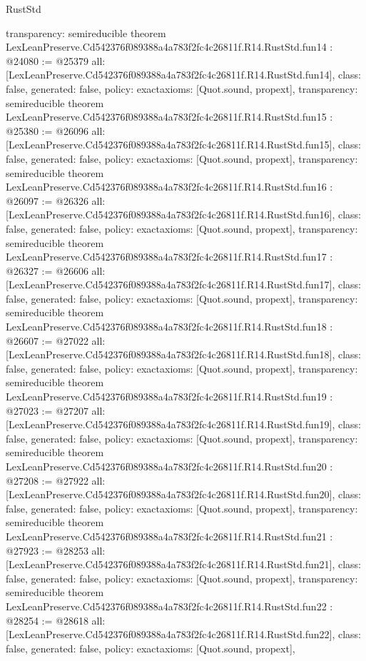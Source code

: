 \begin{lexlean}{RustStd}
\begin{coremodule}
{  transparency: semireducible
}
theorem LexLeanPreserve.Cd542376f089388a4a783f2fc4c26811f.R14.RustStd.fun14 : @24080 := @25379 {
  all: [LexLeanPreserve.Cd542376f089388a4a783f2fc4c26811f.R14.RustStd.fun14],
  class: false,
  generated: false,
  policy: exact{axioms: [Quot.sound, propext]},
  transparency: semireducible
}
theorem LexLeanPreserve.Cd542376f089388a4a783f2fc4c26811f.R14.RustStd.fun15 : @25380 := @26096 {
  all: [LexLeanPreserve.Cd542376f089388a4a783f2fc4c26811f.R14.RustStd.fun15],
  class: false,
  generated: false,
  policy: exact{axioms: [Quot.sound, propext]},
  transparency: semireducible
}
theorem LexLeanPreserve.Cd542376f089388a4a783f2fc4c26811f.R14.RustStd.fun16 : @26097 := @26326 {
  all: [LexLeanPreserve.Cd542376f089388a4a783f2fc4c26811f.R14.RustStd.fun16],
  class: false,
  generated: false,
  policy: exact{axioms: [Quot.sound, propext]},
  transparency: semireducible
}
theorem LexLeanPreserve.Cd542376f089388a4a783f2fc4c26811f.R14.RustStd.fun17 : @26327 := @26606 {
  all: [LexLeanPreserve.Cd542376f089388a4a783f2fc4c26811f.R14.RustStd.fun17],
  class: false,
  generated: false,
  policy: exact{axioms: [Quot.sound, propext]},
  transparency: semireducible
}
theorem LexLeanPreserve.Cd542376f089388a4a783f2fc4c26811f.R14.RustStd.fun18 : @26607 := @27022 {
  all: [LexLeanPreserve.Cd542376f089388a4a783f2fc4c26811f.R14.RustStd.fun18],
  class: false,
  generated: false,
  policy: exact{axioms: [Quot.sound, propext]},
  transparency: semireducible
}
theorem LexLeanPreserve.Cd542376f089388a4a783f2fc4c26811f.R14.RustStd.fun19 : @27023 := @27207 {
  all: [LexLeanPreserve.Cd542376f089388a4a783f2fc4c26811f.R14.RustStd.fun19],
  class: false,
  generated: false,
  policy: exact{axioms: [Quot.sound, propext]},
  transparency: semireducible
}
theorem LexLeanPreserve.Cd542376f089388a4a783f2fc4c26811f.R14.RustStd.fun20 : @27208 := @27922 {
  all: [LexLeanPreserve.Cd542376f089388a4a783f2fc4c26811f.R14.RustStd.fun20],
  class: false,
  generated: false,
  policy: exact{axioms: [Quot.sound, propext]},
  transparency: semireducible
}
theorem LexLeanPreserve.Cd542376f089388a4a783f2fc4c26811f.R14.RustStd.fun21 : @27923 := @28253 {
  all: [LexLeanPreserve.Cd542376f089388a4a783f2fc4c26811f.R14.RustStd.fun21],
  class: false,
  generated: false,
  policy: exact{axioms: [Quot.sound, propext]},
  transparency: semireducible
}
theorem LexLeanPreserve.Cd542376f089388a4a783f2fc4c26811f.R14.RustStd.fun22 : @28254 := @28618 {
  all: [LexLeanPreserve.Cd542376f089388a4a783f2fc4c26811f.R14.RustStd.fun22],
  class: false,
  generated: false,
  policy: exact{axioms: [Quot.sound, propext]},
}
\end{coremodule}
\end{lexlean}
